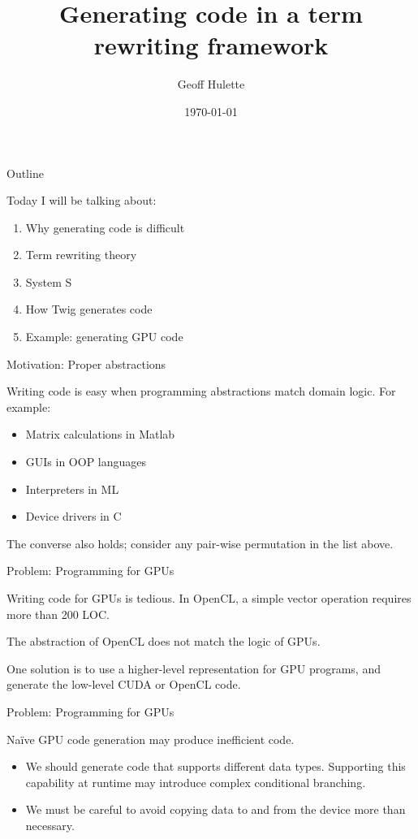 \documentclass{beamer}
\title{Generating code in a term rewriting framework}
\author{Geoff Hulette}
\date{\today}
\begin{document}
\begin{frame}[plain]
  \titlepage
\end{frame}

\begin{frame}{Outline}

Today I will be talking about:

\begin{enumerate}
  \item Why generating code is difficult
  \item Term rewriting theory
  \item System S
  \item How Twig generates code
  \item Example: generating GPU code
\end{enumerate}

\end{frame}


\begin{frame}{Motivation: Proper abstractions}

Writing code is easy when programming abstractions match domain logic. For
example:

\begin{itemize}
\item Matrix calculations in Matlab
\item GUIs in OOP languages
\item Interpreters in ML
\item Device drivers in C
\end{itemize}

The converse also holds; consider any pair-wise permutation in the list above.

\end{frame}


\begin{frame}{Problem: Programming for GPUs}

Writing code for GPUs is tedious. In OpenCL, a simple vector operation
requires more than 200 LOC. 

The abstraction of OpenCL does not match the logic of GPUs.

One solution is to use a higher-level representation for GPU programs, and
generate the low-level CUDA or OpenCL code.

\end{frame}

\begin{frame}{Problem: Programming for GPUs}

Na\"ive GPU code generation may produce inefficient code.

\begin{itemize}

\item We should generate code that supports different data types. Supporting
this capability at runtime may introduce complex conditional branching.

\item We must be careful to avoid copying data to and from the device more
than necessary.

\end{itemize}

\end{frame}
\end{document}
